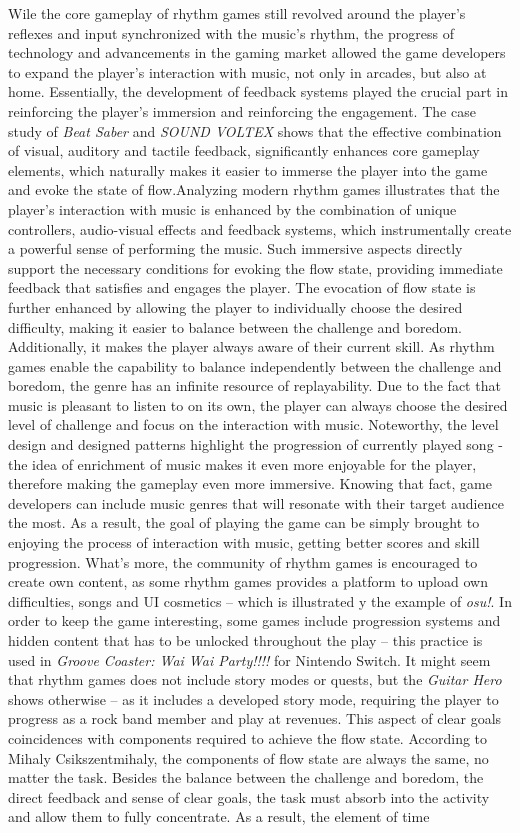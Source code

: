 Wile the core gameplay of rhythm games still revolved around the player's reflexes and input synchronized with the music's rhythm, the progress of technology and advancements in the gaming market allowed the game developers to expand the player's interaction with music, not only in arcades, but also at home. Essentially, the development of feedback systems played the crucial part in reinforcing the player's immersion and reinforcing the engagement. The case study of \textit{Beat Saber} and \textit{SOUND VOLTEX} shows that the effective combination of visual, auditory and tactile feedback, significantly enhances core gameplay elements, which naturally makes it easier to immerse the player into the game and evoke the state of flow.Analyzing modern rhythm games illustrates that the player's interaction with music is enhanced by the combination of unique controllers, audio-visual effects and feedback systems, which instrumentally create a powerful sense of performing the music. Such immersive aspects directly support the necessary conditions for evoking the flow state, providing immediate feedback that satisfies and engages the player. The evocation of flow state is further enhanced by allowing the player to individually choose the desired difficulty, making it easier to balance between the challenge and boredom. Additionally, it makes the player always aware of their current skill. As rhythm games enable the capability to balance independently between the challenge and boredom, the genre has an infinite resource of replayability. Due to the fact that music is pleasant to listen to on its own, the player can always choose the desired level of challenge and focus on the interaction with music. Noteworthy, the level design and designed patterns highlight the progression of currently played song - the idea of enrichment of music makes it even more enjoyable for the player, therefore making the gameplay even more immersive. Knowing that fact, game developers can include music genres that will resonate with their target audience the most. As a result, the goal of playing the game can be simply brought to enjoying the process of interaction with music, getting better scores and skill progression. What's more, the community of rhythm games is encouraged to create own content, as some rhythm games provides a platform to upload own difficulties, songs and UI cosmetics -- which is illustrated y the example of \textit{osu!}. In order to keep the game interesting, some games include progression systems and hidden content that has to be unlocked throughout the play -- this practice is used in \textit{Groove Coaster: Wai Wai Party!!!!} for Nintendo Switch. It might seem that rhythm games does not include story modes or quests, but the \textit{Guitar Hero} shows otherwise -- as it includes a developed story mode, requiring the player to progress as a rock band member and play at revenues. This aspect of clear goals coincidences with components required to achieve the flow state. According to Mihaly Csikszentmihaly, the components of flow state are always the same, no matter the task. Besides the balance between the challenge and boredom, the direct feedback and sense of clear goals, the task must absorb into the activity and allow them to fully concentrate. As a result, the element of time 
